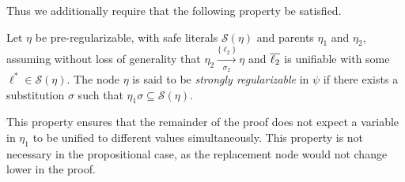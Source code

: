 
\noindent
Thus we additionally require that the following property be satisfied.
\begin{definition}
\label{prop:extracheck}
Let $\eta$ be pre-regularizable, with safe literals $\mathcal{S}(\eta)$ and parents $\eta_1$ and $\eta_2$, assuming without loss of generality that
$\eta_2 \xrightarrow[\sigma_2]{\{\ell_2\} } \eta$ and $\overline{\ell_2}$ is unifiable with some $\ell^* \in \mathcal{S}(\eta)$. 
The node $\eta$ is said to be \emph{strongly regularizable} in $\psi$ if there exists a substitution $\sigma$ such that $\eta_1\sigma \subseteq \mathcal{S}(\eta)$.
\end{definition}
This property ensures that the remainder of the proof does not expect a variable in $\eta_1$ to be unified to different values simultaneously. This property is not necessary in the propositional case, as the replacement node would not change lower in the proof. 





